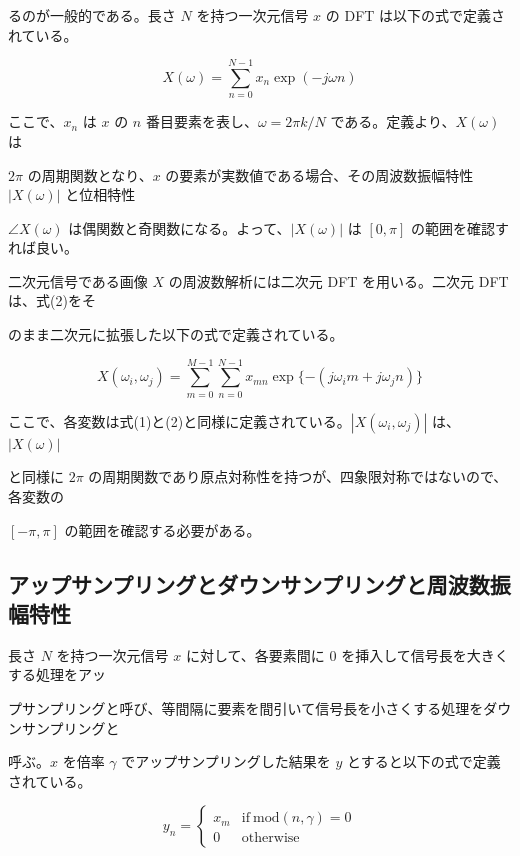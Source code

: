\documentclass[dvipdfmx]{jsarticle}
\begin{document}
るのが一般的である。長さ $N$ を持つ一次元信号 $x$ の DFT は以下の式で定義されている。

\begin{equation}
X(\omega)=
\sum_{n=0}^{N-1}
x_n \exp(-j\omega n)
\tag{2}
\end{equation}

ここで、$x_n$ は $x$ の $n$ 番目要素を表し、$\omega = 2\pi k/N$ である。定義より、$X(\omega)$ は

$2\pi$ の周期関数となり、$x$ の要素が実数値である場合、その周波数振幅特性 $|X(\omega)|$ と位相特性

$\angle X(\omega)$ は偶関数と奇関数になる。よって、$|X(\omega)|$ は $[0,\pi]$ の範囲を確認すれば良い。

二次元信号である画像 $X$ の周波数解析には二次元 DFT を用いる。二次元 DFT は、式(2)をそ

のまま二次元に拡張した以下の式で定義されている。

\begin{equation}
X(\omega_i,\omega_j)=
\sum_{m=0}^{M-1}
\sum_{n=0}^{N-1}
x_{mn}
\exp\{-(j\omega_i m+j\omega_j n)\}
\tag{3}
\end{equation}

ここで、各変数は式(1)と(2)と同様に定義されている。$|X(\omega_i,\omega_j)|$ は、$|X(\omega)|$

と同様に $2\pi$ の周期関数であり原点対称性を持つが、四象限対称ではないので、各変数の

$[-\pi,\pi]$ の範囲を確認する必要がある。

\subsection{アップサンプリングとダウンサンプリングと周波数振幅特性}

長さ $N$ を持つ一次元信号 $x$ に対して、各要素間に 0 を挿入して信号長を大きくする処理をアッ

プサンプリングと呼び、等間隔に要素を間引いて信号長を小さくする処理をダウンサンプリングと

呼ぶ。$x$ を倍率 $\gamma$ でアップサンプリングした結果を $y$ とすると以下の式で定義されている。

\begin{equation}
y_n =
\begin{cases}
x_m & \mathrm{if}\ \mathrm{mod}(n,\gamma)=0 \\
0 & \mathrm{otherwise}
\end{cases}
\tag{4}
\end{equation}
\end{document}
